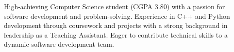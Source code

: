 \documentclass[10pt,a4paper,withhypeper,normalphoto]{altacv}
\begin{document}


\makecvheader

High-achieving Computer Science student (CGPA 3.80) with a passion for software development and problem-solving.
Experience in C++ and Python development through coursework and projects with a strong background in leadership as a Teaching Assistant.
Eager to contribute technical skills to a dynamic software development team.


\end{document}
